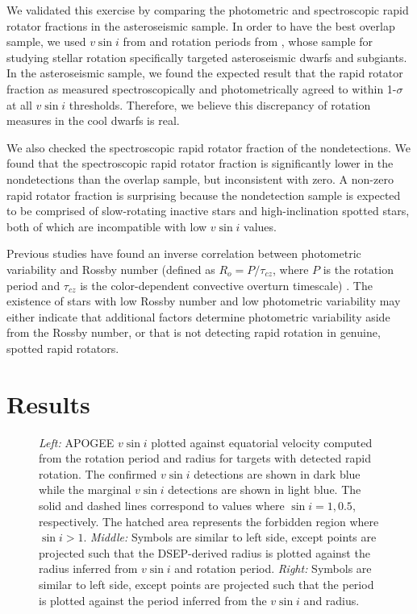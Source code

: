 \documentclass[manuscript]{aastex6}
\newcommand{\vsini}{\ensuremath{v \sin i}}
\begin{document}
We validated this exercise by comparing the photometric and spectroscopic
rapid rotator fractions in the asteroseismic sample. In order to have the best
overlap sample, we used \vsini{} from \citet{Bruntt12} and rotation periods
from \citet{Garcia14}, whose sample for studying stellar rotation specifically
targeted asteroseismic dwarfs and subgiants. In the asteroseismic
sample, we found the expected result that the rapid rotator
fraction as measured spectroscopically and photometrically agreed to within
1-\(\sigma\) at all \vsini{} thresholds. Therefore, we believe this
discrepancy of rotation measures in the cool dwarfs is real.

We also checked the spectroscopic rapid rotator fraction of the 
\citet{McQuillan14} nondetections. We found that the spectroscopic rapid 
rotator fraction is significantly
lower in the nondetections than the overlap sample, but inconsistent with zero. 
A non-zero rapid rotator fraction is surprising because the nondetection
sample is expected to be comprised of slow-rotating inactive stars and 
high-inclination spotted stars, both of which are incompatible with low 
\vsini{} values. 

Previous studies have found an inverse correlation between 
photometric variability and Rossby number (defined as \(R_o = P / \tau_{cz}\), where \(P\)
    is the rotation period and \(\tau_{cz}\) is the color-dependent 
convective overturn timescale) \citep{Messina01,Hartman09}. The existence of 
stars with low Rossby number and low photometric variability may either 
indicate that additional factors determine photometric variability 
aside from the Rossby number, or that \citet{McQuillan14} is not detecting 
rapid rotation in genuine, spotted rapid rotators.



\section{Results}
\label{sec:results}

\begin{figure*}
  \caption{\emph{Left:} APOGEE \vsini{} plotted against equatorial
  velocity computed from the rotation period and radius for targets with
  detected rapid rotation. The confirmed \vsini{} detections are shown
  in dark blue while the marginal \vsini{} detections are shown in light
  blue. The solid and dashed lines correspond to values where \(\sin i =
  1, 0.5\), respectively. The hatched area represents the forbidden
  region where \(\sin i > 1\). \emph{Middle:} Symbols are similar to left
  side, except points are projected such that the DSEP-derived radius is
  plotted against the radius inferred from \vsini{} and rotation
  period. \emph{Right:} Symbols are similar to left side, except points are
  projected such that the \citet{McQuillan14} period is plotted against the
  period inferred from the \vsini{} and radius.\label{fig:rot}}
\end{figure*}
\end{document}
